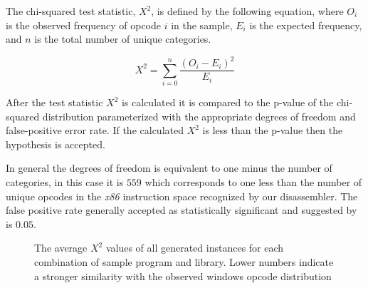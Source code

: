 \documentclass[finalcopy,short]{srpaper}
\begin{document}

        The chi-squared test statistic, $X^2$, is defined by the following
        equation, where $O_i$ is the observed frequency of opcode $i$ in the
        sample, $E_i$ is the expected frequency, and $n$ is the total number of
        unique categories.

        $$X^2 = \sum_{i=0}^{n} \frac{(O_i - E_i)^2}{E_i}$$

        After the test statistic $X^2$ is calculated it is compared to the
        p-value of the chi-squared distribution parameterized with the
        appropriate degrees of freedom and false-positive error rate. If the
        calculated $X^2$ is less than the p-value then the hypothesis is
        accepted.

        In general the degrees of freedom is equivalent to one minus the number
        of categories, in this case it is $559$ which corresponds to one less
        than the number of unique opcodes in the \emph{x86} instruction space
        recognized by our disassembler. The false positive rate generally
        accepted as statistically significant and suggested by \cite{chisquared}
        is $0.05$.

        \begin{figure}[t!]
            \vspace{-50pt}
            \caption{The average $X^2$ values of all generated instances for
                each combination of sample program and library. Lower numbers
                indicate a stronger similarity with the observed windows opcode
                distribution}
            \label{tab:results-windows-like-avg}
        \end{figure}
\end{document}
